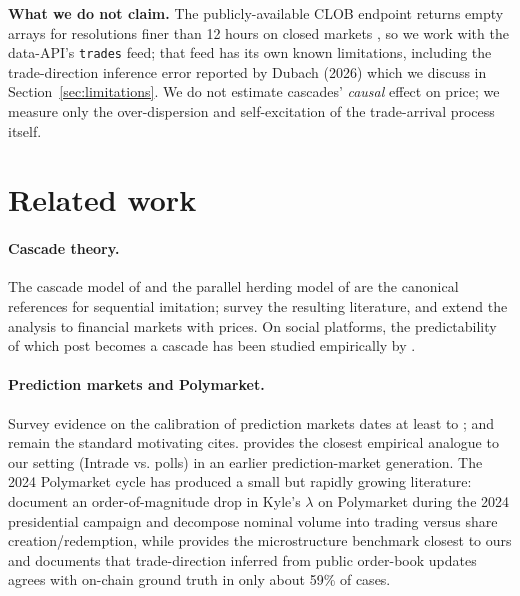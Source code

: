 \documentclass{article}
\begin{document}
\textbf{What we do not claim.} The publicly-available CLOB endpoint
returns empty arrays for resolutions finer than 12 hours on closed
markets \citep[as documented in the now-archived
\texttt{py-clob-client} issue tracker; see also][]{dubach2026anatomy},
so we work with the data-API's \texttt{trades} feed; that feed has
its own known limitations, including the trade-direction inference
error reported by Dubach (2026) which we discuss in
Section~\ref{sec:limitations}. We do not estimate cascades' \emph{causal}
effect on price; we measure only the over-dispersion and
self-excitation of the trade-arrival process itself.

\section{Related work}

\paragraph{Cascade theory.} The cascade model of
\citet{bikhchandani1992theory} and the parallel herding model of
\citet{banerjee1992simple} are the canonical references for sequential
imitation; \citet{bikhchandani1998learning} survey the resulting
literature, and \citet{avery1998multidimensional} extend the analysis to
financial markets with prices. On social platforms, the predictability
of which post becomes a cascade has been studied empirically by
\citet{cheng2014can}.

\paragraph{Prediction markets and Polymarket.} Survey evidence on the
calibration of prediction markets dates at least to
\citet{berg2008results}; \citet{wolfers2004prediction} and
\citet{arrow2008promise} remain the standard motivating cites.
\citet{rothschild2009forecasting} provides the closest empirical analogue
to our setting (Intrade vs. polls) in an earlier prediction-market
generation. The 2024 Polymarket cycle has produced a small but rapidly
growing literature: \citet{tsang2026anatomy} document an order-of-magnitude
drop in Kyle's $\lambda$ on Polymarket during the 2024 presidential
campaign and decompose nominal volume into trading versus share
creation/redemption, while \citet{dubach2026anatomy} provides the
microstructure benchmark closest to ours and documents that
trade-direction inferred from public order-book updates agrees with
on-chain ground truth in only about 59\% of cases.
\end{document}
